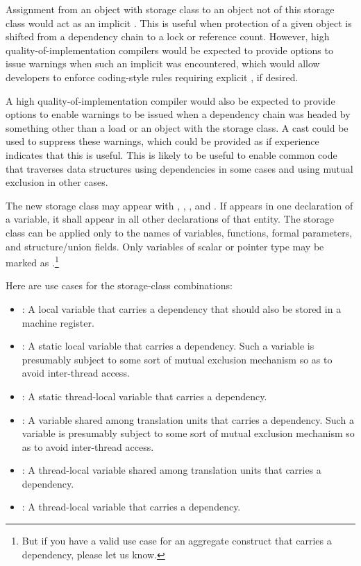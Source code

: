 \documentclass[letterpaper,twocolumn,10pt]{article}
\begin{document}
Assignment from an object with  storage
class to an object not of this storage class would
act as an implicit .
This is useful when protection of a given object is shifted from
a dependency chain to a lock or reference count.
However, high quality-of-implementation compilers would be
expected to provide options to issue warnings when such an implicit
 was encountered, which would allow
developers to enforce coding-style rules requiring explicit
, if desired.

A high quality-of-implementation compiler would also be expected to
provide options to enable warnings to be issued when a dependency chain
was headed by something other than a 
load or an object with the  storage class.
A cast could be used to suppress these warnings, which could be
provided as  if experience indicates
that this is useful.
This  is likely to be useful to enable
common code that traverses data structures using dependencies in some
cases and using mutual exclusion in other cases.

The new  storage class may appear with
, , , and .
If  appears in one declaration of a variable,
it shall appear in all other declarations of that entity.
The  storage class can be applied only
to the names of variables, functions, formal parameters, and
structure/union fields.
Only variables of scalar or pointer type may be marked as
.\footnote{
	But if you have a valid use case for an aggregate construct
	that carries a dependency, please let us know.}

Here are use cases for the storage-class combinations:

\begin{itemize}
\item	{}:  A local variable that
	carries a dependency that should also be stored in a
	machine register.
\item	{}:  A static local variable
	that carries a dependency.
	Such a variable is presumably subject to some sort of
	mutual exclusion mechanism so as to avoid inter-thread
	access.
\item	{}: A static
	thread-local variable that carries a dependency.
\item	{}: A variable shared among
	translation units that carries a dependency.
	Such a variable is presumably subject to some sort of
	mutual exclusion mechanism so as to avoid inter-thread
	access.
\item	{}: A
	thread-local variable shared among translation units
	that carries a dependency.
\item	{}: A
	thread-local variable that carries a dependency.
\end{itemize}
\end{document}
